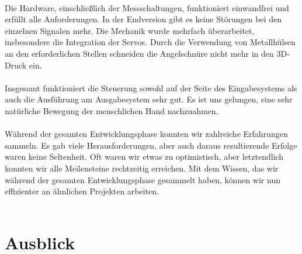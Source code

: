 \documentclass[titlepage,12pt,twoside]{article}
\begin{document}
\\
Die Hardware, einschließlich der Messschaltungen, funktioniert einwandfrei und 
erfüllt alle Anforderungen. In der Endversion gibt es keine Störungen bei den 
einzelnen Signalen mehr. Die Mechanik wurde mehrfach überarbeitet, insbesondere 
die Integration der Servos. Durch die Verwendung von Metallhülsen an den erforderlichen 
Stellen schneiden die Angelschnüre nicht mehr in den 3D-Druck ein. \\
\\
Insgesamt funktioniert die Steuerung sowohl auf der Seite des Eingabesystems 
als auch die Ausführung am Ausgabesystem sehr gut. Es ist uns gelungen, eine 
sehr natürliche Bewegung der menschlichen Hand nachzuahmen. \\
\\
Während der gesamten Entwicklungsphase konnten wir zahlreiche Erfahrungen 
sammeln. Es gab viele Herausforderungen, aber auch daraus resultierende 
Erfolge waren keine Seltenheit. Oft waren wir etwas zu optimistisch, aber 
letztendlich konnten wir alle Meilensteine rechtzeitig erreichen. Mit dem 
Wissen, das wir während der gesamten Entwicklungsphase gesammelt haben, können
wir nun effizienter an ähnlichen Projekten arbeiten. \\
\\

\newpage
\section{Ausblick}
\label{chap:Ausblick}
\end{document}
